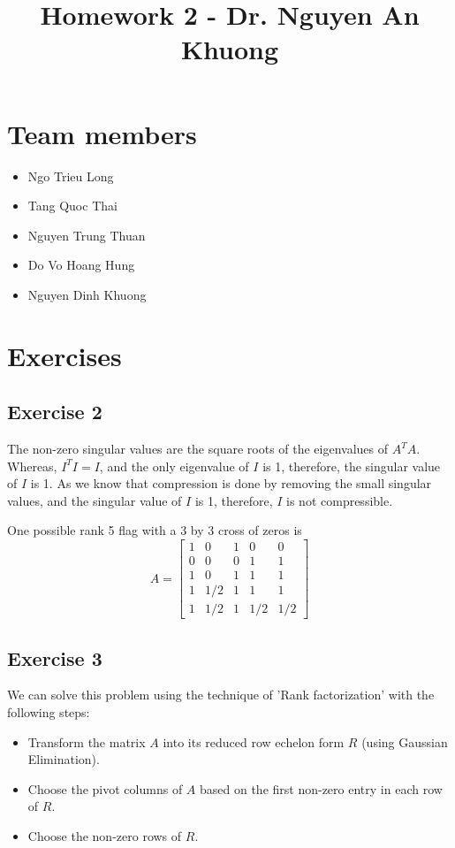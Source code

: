\documentclass{article}
\author{}
\begin{document}
\title{Homework 2 - Dr. Nguyen An Khuong}
\maketitle
\section{Team members}
\begin{itemize}
    \item Ngo Trieu Long
    \item Tang Quoc Thai
    \item Nguyen Trung Thuan
    \item Do Vo Hoang Hung
    \item Nguyen Dinh Khuong
\end{itemize}

\section{Exercises}
\subsection{Exercise 2}
The non-zero singular values are the square roots of the eigenvalues of $A^{T}A$. Whereas, $I^{T}I = I$, and the only eigenvalue of $I$ is 1, therefore, the singular value of $I$ is 1. As we know that compression is done by removing the small singular values, and the singular value of $I$ is 1, therefore, $I$ is not compressible.

One possible rank 5 flag with a 3 by 3 cross of zeros is
\[
    A =
    \begin{bmatrix}
        1 & 0   & 1 & 0   & 0   \\
        0 & 0   & 0 & 1   & 1   \\
        1 & 0   & 1 & 1   & 1   \\
        1 & 1/2 & 1 & 1   & 1   \\
        1 & 1/2 & 1 & 1/2 & 1/2
    \end{bmatrix}
\]


\subsection{Exercise 3}
We can solve this problem using the technique of 'Rank factorization' with the following steps:

\begin{itemize}
    \item Transform the matrix $A$ into its reduced row echelon form $R$ (using Gaussian Elimination).
    \item Choose the pivot columns of $A$ based on the first non-zero entry in each row of $R$.
    \item Choose the non-zero rows of $R$.
\end{itemize}
\end{document}
